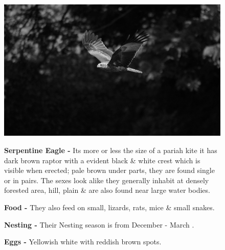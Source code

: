 \begin{figure}[H]
\begin{center}
\includegraphics{figure/Land_birds/01_pariah_kite/pariah-kite.eps}
\end{center}
\medskip
\noindent
{\bf Serpentine Eagle -} Its more or less the size of a pariah kite it has dark brown raptor with a evident black \& white crest which is visible when erected; pale brown under parts, they are found single or in pairs. The sexes look alike they generally inhabit at densely forested area, hill, plain \& are also found near large water bodies.

\medskip

{\bf Food -} They also feed on small, lizards, rats, mice \& small snakes. 

{\bf Nesting -} Their Nesting season is from December - March . 

{\bf Eggs -} Yellowish white with reddish brown spots.
\end{figure}

\vfill\eject

~\phantom{a}
\vfill

